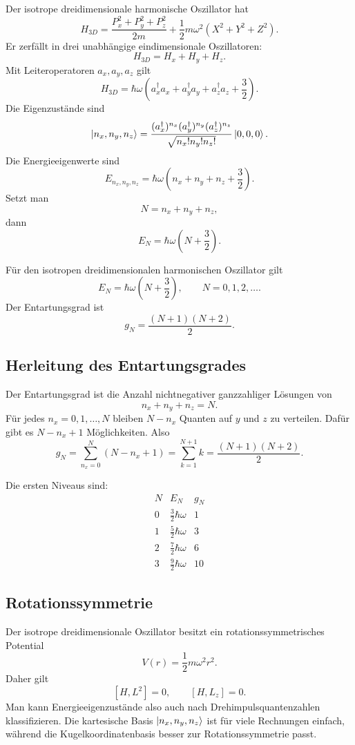 Der isotrope dreidimensionale harmonische Oszillator hat
\[
    H_{3D}=\frac{P_x^2+P_y^2+P_z^2}{2m}
    +\frac12m\omega^2(X^2+Y^2+Z^2).
\]
Er zerfällt in drei unabhängige eindimensionale Oszillatoren:
\[
    H_{3D}=H_x+H_y+H_z.
\]
Mit Leiteroperatoren $a_x,a_y,a_z$ gilt
\[
    H_{3D}=\hbar\omega\left(a_x^\dagger a_x+a_y^\dagger a_y+a_z^\dagger a_z+\frac32\right).
\]
Die Eigenzustände sind
\[
    \left|n_x,n_y,n_z\right\rangle
    =\frac{(a_x^\dagger)^{n_x}(a_y^\dagger)^{n_y}(a_z^\dagger)^{n_z}}{\sqrt{n_x!n_y!n_z!}}\left|0,0,0\right\rangle.
\]
Die Energieeigenwerte sind
\[
    E_{n_x,n_y,n_z}=\hbar\omega\left(n_x+n_y+n_z+\frac32\right).
\]
Setzt man
\[
    N=n_x+n_y+n_z,
\]
dann
\[
    E_N=\hbar\omega\left(N+\frac32\right).
\]

\begin{formulabox}
Für den isotropen dreidimensionalen harmonischen Oszillator gilt
\[
    E_N=\hbar\omega\left(N+\frac32\right),
    \qquad N=0,1,2,\dots.
\]
Der Entartungsgrad ist
\[
    g_N=\frac{(N+1)(N+2)}{2}.
\]
\end{formulabox}

\subsection{Herleitung des Entartungsgrades}

Der Entartungsgrad ist die Anzahl nichtnegativer ganzzahliger Lösungen von
\[
    n_x+n_y+n_z=N.
\]
Für jedes $n_x=0,1,\dots,N$ bleiben $N-n_x$ Quanten auf $y$ und $z$ zu verteilen. Dafür gibt es $N-n_x+1$ Möglichkeiten. Also
\[
    g_N=\sum_{n_x=0}^{N}(N-n_x+1)=\sum_{k=1}^{N+1}k=\frac{(N+1)(N+2)}{2}.
\]

\begin{examplebox}
Die ersten Niveaus sind:
\[
\begin{array}{c|c|c}
N & E_N & g_N \\
\hline
0 & \frac32\hbar\omega & 1 \\
1 & \frac52\hbar\omega & 3 \\
2 & \frac72\hbar\omega & 6 \\
3 & \frac92\hbar\omega & 10
\end{array}
\]
\end{examplebox}

\subsection{Rotationssymmetrie}

Der isotrope dreidimensionale Oszillator besitzt ein rotationssymmetrisches Potential
\[
    V(r)=\frac12m\omega^2r^2.
\]
Daher gilt
\[
    [H,L^2]=0,
    \qquad
    [H,L_z]=0.
\]
Man kann Energieeigenzustände also auch nach Drehimpulsquantenzahlen klassifizieren. Die kartesische Basis $\left|n_x,n_y,n_z\right\rangle$ ist für viele Rechnungen einfach, während die Kugelkoordinatenbasis besser zur Rotationssymmetrie passt.

